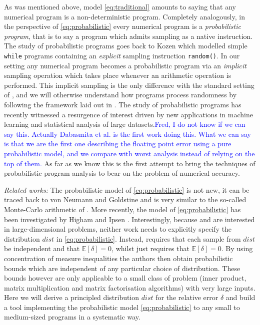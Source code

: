 \documentclass[10pt,conference]{IEEEtran}
\newcommand{\Exp}[1]{\mathbb{E}\left[#1\right]}
\newcommand{\Rocco}{\textcolor{blue}}
\begin{document}
As was mentioned above, model \eqref{eq:traditional} amounts to saying that any numerical program is a non-deterministic program. Completely analogously, in the perspective of \cref{eq:probabilistic} every numerical program is a \emph{probabilistic program}, that is to say a program which admits sampling as a native instruction. The study of probabilistic programs goes back to Kozen \cite{K81c} which modelled simple \texttt{while} programs containing an \emph{explicit} sampling instruction \texttt{random()}. In our setting any numerical program becomes a probabilistic program via an \emph{implicit} sampling operation which takes place whenever an arithmetic operation is performed. This implicit sampling is the only difference with the standard setting of \cite{K81c}, and we will otherwise understand how programs process randomness by following the framework laid out in \cite{K81c}. The study of probabilistic programs has recently witnessed a resurgence of interest driven by new applications in machine learning and statistical analysis of large datasets.\Rocco{Fred, I do not know if we can say this. Actually Dabasmita et al. is the first work doing this. What we can say is that we are the first one describing the floating point error using a pure probabilistic model, and we compare with worst analysis instead of relying on the top of them.} As far as we know this is the first attempt to bring the techniques of probabilistic program analysis to bear on the problem of numerical accuracy.

\emph{Related works: }
The probabilistic model of \cref{eq:probabilistic} is not new, it can be traced back to von Neumann and Goldstine \cite{von1947numerical} and is very similar to the so-called Monte-Carlo arithmetic of \cite{parker1997monte}.
 More recently, the model of \cref{eq:probabilistic} has been investigated by Higham \cite{higham2019new}
and Ipsen \cite{ipsen2019probabilistic}. Interestingly, because \cite{higham2019new} and \cite{ipsen2019probabilistic} are interested in large-dimensional problems, neither work needs to explicitly specify the distribution $dist$ in \cref{eq:probabilistic}. Instead, \cite{higham2019new} requires that each sample from $dist$ be independent and that $\Exp{\delta}=0$, whilst \cite{ipsen2019probabilistic} just requires that $\Exp{\delta}=0$. By using concentration of measure inequalities the authors then obtain probabilistic bounds which are independent of any particular choice of distribution. 
These bounds however are only applicable to a small class of problem (inner product, matrix multiplication and matrix factorisation algorithms) with very large inputs. Here we will derive a principled distribution $dist$ for the relative error $\delta$ and build a tool implementing the probabilistic model \cref{eq:probabilistic} to any small to medium-sized programs in a systematic way.
\end{document}
